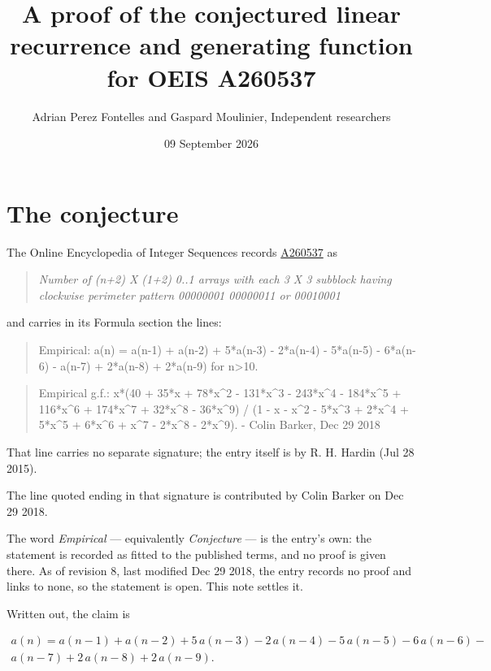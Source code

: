 \documentclass[11pt]{article}
\title{A proof of the conjectured linear recurrence and generating function for OEIS A260537}
\author{Adrian Perez Fontelles and Gaspard Moulinier, Independent researchers}
\date{09 September 2026}
\theoremstyle{definition}
\begin{document}
\maketitle
\section{The conjecture}

The Online Encyclopedia of Integer Sequences records \href{https://oeis.org/A260537}{A260537} as

\begin{quote}\itshape Number of (n+2) X (1+2) 0..1 arrays with each 3 X 3 subblock having clockwise perimeter pattern 00000001 00000011 or 00010001\end{quote}

and carries in its Formula section the lines:

\begin{quote}\ttfamily Empirical: a(n) = a(n-1) + a(n-2) + 5*a(n-3) - 2*a(n-4) - 5*a(n-5) - 6*a(n-6) - a(n-7) + 2*a(n-8) + 2*a(n-9) for n>10.\end{quote}

\begin{quote}\ttfamily Empirical g.f.: x*(40 + 35*x + 78*x\textasciicircum{}2 - 131*x\textasciicircum{}3 - 243*x\textasciicircum{}4 - 184*x\textasciicircum{}5 + 116*x\textasciicircum{}6 + 174*x\textasciicircum{}7 + 32*x\textasciicircum{}8 - 36*x\textasciicircum{}9) / (1 - x - x\textasciicircum{}2 - 5*x\textasciicircum{}3 + 2*x\textasciicircum{}4 + 5*x\textasciicircum{}5 + 6*x\textasciicircum{}6 + x\textasciicircum{}7 - 2*x\textasciicircum{}8 - 2*x\textasciicircum{}9). - Colin Barker, Dec 29 2018\end{quote}

That line carries no separate signature; the entry itself is by R. H. Hardin (Jul 28 2015).

The line quoted ending in that signature is contributed by Colin Barker on Dec 29 2018.

The word {\itshape Empirical} --- equivalently {\itshape Conjecture} --- is the entry's own: the statement is recorded as fitted to the published terms, and no proof is given there. As of revision 8, last modified Dec 29 2018, the entry records no proof and links to none, so the statement is open. This note settles it.

Written out, the claim is

\begin{multline*} a(n) = a(n-1) + a(n-2) + 5\,a(n-3) - 2\,a(n-4) - 5\,a(n-5) - 6\,a(n-6) - \\ a(n-7) + 2\,a(n-8) + 2\,a(n-9). \end{multline*}
\end{document}
